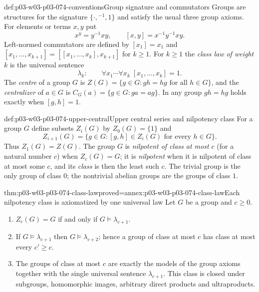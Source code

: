 \begin{hbconvention}{def:p03-w03-p03-074-conventions}{Group signature and commutators}
Groups are structures for the signature \(\{\cdot,{}^{-1},1\}\) and
satisfy the usual three group axioms. For elements or terms \(x,y\) put
\[
  x^y=y^{-1}xy,\qquad [x,y]=x^{-1}y^{-1}xy .
\]
Left-normed commutators are defined by \([x_1]=x_1\) and
\([x_1,\ldots,x_{k+1}]=[[x_1,\ldots,x_k],x_{k+1}]\) for \(k\ge1\). For
\(k\ge1\) the \emph{class law of weight \(k\)} is the universal sentence
\[
  \lambda_k:\qquad \forall x_1\cdots\forall x_k\;[x_1,\ldots,x_k]=1 .
\]
The \emph{centre} of a group \(G\) is
\(Z(G)=\{g\in G:gh=hg\text{ for all }h\in G\}\), and the
\emph{centralizer} of \(a\in G\) is \(C_G(a)=\{g\in G:ga=ag\}\). In
any group \(gh=hg\) holds exactly when \([g,h]=1\).
\end{hbconvention}

\begin{hbdefinition}{def:p03-w03-p03-074-upper-central}{Upper central series and nilpotency class}
For a group \(G\) define subsets \(Z_i(G)\) by \(Z_0(G)=\{1\}\) and
\[
  Z_{i+1}(G)=\{g\in G:[g,h]\in Z_i(G)\text{ for every }h\in G\}.
\]
Thus \(Z_1(G)=Z(G)\). The group \(G\) is \emph{nilpotent of class at most
\(c\)} (for a natural number \(c\)) when \(Z_c(G)=G\); it is
\emph{nilpotent} when it is nilpotent of class at most some \(c\), and its
\emph{class} is then the least such \(c\). The trivial group is the only
group of class \(0\); the nontrivial abelian groups are the groups of
class \(1\).
\end{hbdefinition}

\begin{hbtheorem}{thm:p03-w03-p03-074-class-law}{proved=annex:p03-w03-p03-074-class-law}{Each nilpotency class is axiomatized by one universal law}
Let \(G\) be a group and \(c\ge0\).
\begin{enumerate}
  \item \(Z_c(G)=G\) if and only if \(G\models\lambda_{c+1}\).
  \item If \(G\models\lambda_{c+1}\) then \(G\models\lambda_{c+2}\);
        hence a group of class at most \(c\) has class at most every
        \(c'\ge c\).
  \item The groups of class at most \(c\) are exactly the models of the
        group axioms together with the single universal sentence
        \(\lambda_{c+1}\). This class is closed under subgroups,
        homomorphic images, arbitrary direct products and ultraproducts.
\end{enumerate}
\end{hbtheorem}


